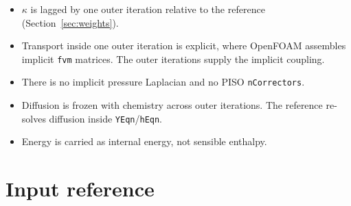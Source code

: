 \documentclass[11pt]{article}
\newcommand{\code}[1]{\texttt{\small #1}}
\begin{document}
\begin{deviation}[s, collected]
\begin{itemize}[leftmargin=*]
  \item $\kappa$ is lagged by one outer iteration relative to the reference (Section~\ref{sec:weights}).
  \item Transport inside one outer iteration is explicit, where OpenFOAM assembles implicit
        \code{fvm} matrices. The outer iterations supply the implicit coupling.
  \item There is no implicit pressure Laplacian and no PISO \code{nCorrectors}.
  \item Diffusion is frozen with chemistry across outer iterations. The reference re-solves
        diffusion inside \code{YEqn}/\code{hEqn}.
  \item Energy is carried as internal energy, not sensible enthalpy.
\end{itemize}
\end{deviation}

\clearpage
\section{Input reference}
\end{document}
